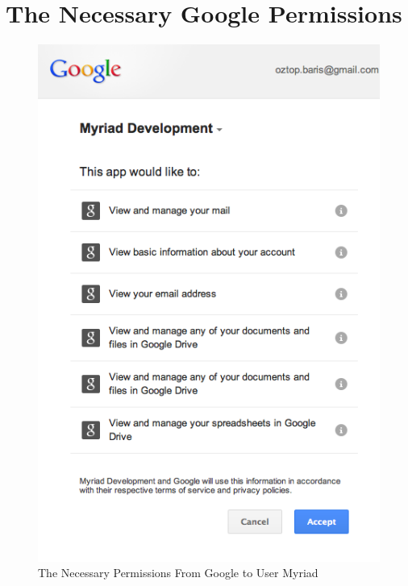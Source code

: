 \chapter{The Necessary Google Permissions}
\label{app:GoogPerm}


\begin{figure}[htbp]
	\centering
	\includegraphics[scale=0.55]{imgs/GooglePermissions.png}
	\caption[The Necessary Permissions From Google to User Myriad]{The Necessary Permissions From Google to User Myriad}
	\label{fig:GooglePermissions}
\end{figure}

